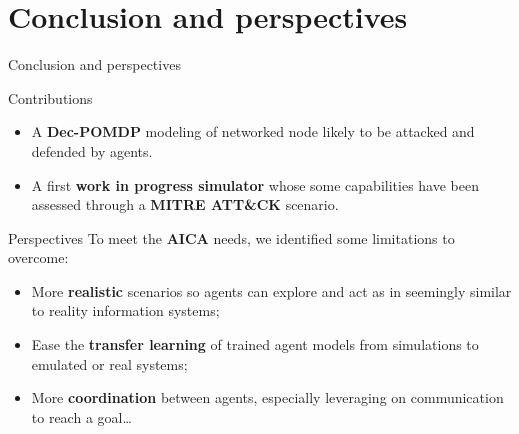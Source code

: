 \section{Conclusion and perspectives}
	\begin{frame}{Conclusion and perspectives}
		{}

            \begin{block}{Contributions}
                \begin{itemize}
                    \item A \textbf{Dec-POMDP} modeling of networked node likely to be attacked and defended by agents.
                    \item A first \textbf{work in progress simulator} whose some capabilities have been assessed through a \textbf{MITRE ATT\&CK} scenario.
                \end{itemize}
            \end{block}

            \begin{alertblock}{Perspectives}
                To meet the \textbf{AICA} needs, we identified some limitations to overcome:

                \begin{itemize}
                    \item More \textbf{realistic} scenarios so agents can explore and act as in seemingly similar to reality information systems;
                    \item Ease the \textbf{transfer learning} of trained agent models from simulations to emulated or real systems;
                    \item More \textbf{coordination} between agents, especially leveraging on communication to reach a goal\dots
                \end{itemize}
            
            \end{alertblock}
	
	\end{frame}






